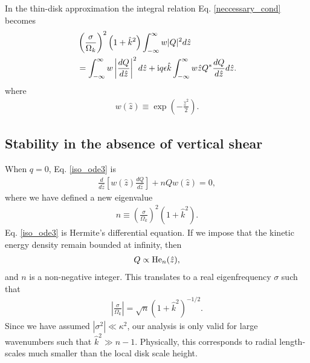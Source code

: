 In the thin-disk approximation the integral relation
Eq. \ref{neccessary_cond} becomes
\begin{align}\label{integral_relation_thin}
 & \left(\frac{\sigma}{\Omega_k}\right)^2\left(1+\hat{k}^2\right)
  \int_{-\infty}^{\infty}w|Q|^2d\hat{z}  \notag\\ 
  & =\int_{-\infty}^{\infty}w\left|\frac{dQ}{d\hat{z}}\right|^2d\hat{z}
  +\mathrm{i} q \epsilon
  \hat{k}\int_{-\infty}^{\infty}w\hat{z}Q^*\frac{dQ}{d\hat{z}}d\hat{z}.    
\end{align}
where 
\begin{align}
  w(\hat{z}) \equiv \exp{\left(-\frac{\hat{z}^2}{2}\right)}.  
\end{align}


\subsection{Stability in the absence of vertical shear}
When $q=0$, Eq. \ref{iso_ode3} is
\begin{align}\label{hermite_ode}
  \frac{d}{d\hat{z}}\left[w(\hat{z})\frac{dQ}{d\hat{z}}\right] + nQ
  w(\hat{z}) =0, 
\end{align}
where we have defined a new eigenvalue
\begin{align}
  n \equiv \left(\frac{\sigma}{\Omega_k}\right)^2(1+\hat{k}^2). 
\end{align} 
Eq. \ref{iso_ode3} is Hermite's differential equation. If we impose
that the kinetic energy density remain bounded at infinity, then  
\begin{align}
  Q \propto \operatorname{He}_n(\hat{z}),
\end{align}
and $n$ is a non-negative integer. This translates to a real
eigenfrequency $\sigma$ such that
\begin{align}
  \left|\frac{\sigma}{\Omega_k}\right| = \sqrt{n}
  \left(1+\hat{k}^2\right)^{-1/2}. 
\end{align}
Since we have assumed $|\sigma^2|\ll \kappa^2$, our analysis is only
valid for large wavenumbers such that $\hat{k}^2\gg 
n-1$. Physically, this corresponds to radial length-scales much
smaller than the local disk scale height. 

